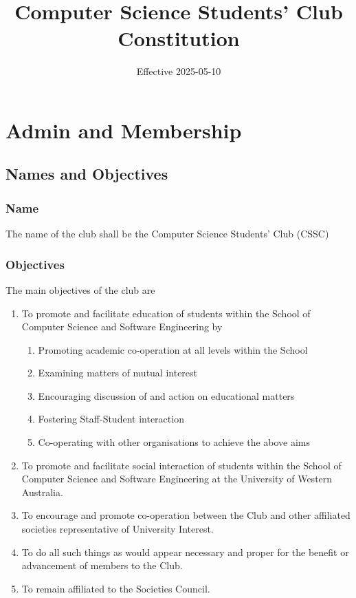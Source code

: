 \documentclass[10pt,a4paper]{report}
\date{Effective 2025-05-10}
\title{Computer Science Students' Club Constitution}
\begin{document}
	\maketitle
	\newpage
	\begin{small}
		\tableofcontents
	\end{small}
	\newpage

	\chapter{Admin and Membership}

	\section{Names and Objectives}
		\subsection{Name}
			The name of the club shall be the Computer Science Students' Club (CSSC)

		\subsection{Objectives}
		The main objectives of the club are
			\begin{enumerate}[label=\alph*]
				\item To promote and facilitate education of students within the School of Computer Science and Software Engineering by
				\begin{enumerate}[label=\roman*]
					\item Promoting academic co-operation at all levels within the School
					\item Examining matters of mutual interest
					\item Encouraging discussion of and action on educational matters
					\item Fostering Staff-Student interaction
					\item Co-operating with other organisations to achieve the above aims
				\end{enumerate}
				\item To promote and facilitate social interaction of students within the School of Computer Science and Software Engineering at the University of Western Australia.
				\item To encourage and promote co-operation between the Club and other affiliated societies representative of University Interest.
				\item To do all such things as would appear necessary and proper for the benefit or advancement of members to the Club.
				\item To remain affiliated to the Societies Council.
			\end{enumerate}
\end{document}

